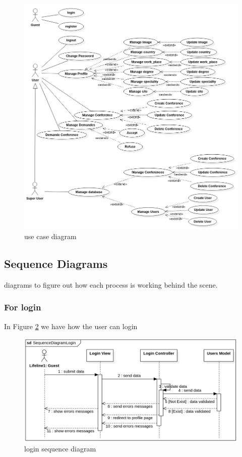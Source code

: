 \documentclass[12pt,a4paper]{article}
\begin{document}
		\begin{figure}[b]
			\centering
			\includegraphics[width=\textwidth]{diagrams/use_case.png}
			\caption{use case diagram}
			\label{fig:use-case-d}
		\end{figure}

	\subsection{Sequence Diagrams}
	diagrams to figure out how each process is working behind the scene.
	
	
		\subsubsection{For login}
		In Figure \ref{fig:login-s-d} we have how the user can login
		
			\begin{figure}[b]
				\centering
				\includegraphics[width=\textwidth]{diagrams/login_sequence.png}
				\caption{login sequence diagram}
				\label{fig:login-s-d}
			\end{figure}
		
\end{document}
